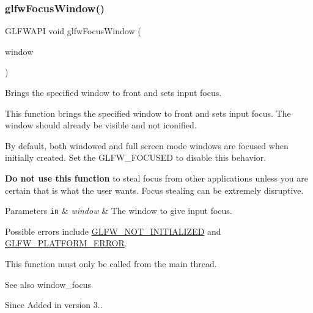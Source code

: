 \subsubsection{\texorpdfstring{glfw\+Focus\+Window()}{glfwFocusWindow()}}
{\footnotesize\ttfamily G\+L\+F\+W\+A\+PI void glfw\+Focus\+Window (\begin{DoxyParamCaption}\item[{\hyperlink{group__window_ga3c96d80d363e67d13a41b5d1821f3242}{G\+L\+F\+Wwindow} $\ast$}]{window }\end{DoxyParamCaption})}



Brings the specified window to front and sets input focus. 

This function brings the specified window to front and sets input focus. The window should already be visible and not iconified.

By default, both windowed and full screen mode windows are focused when initially created. Set the G\+L\+F\+W\+\_\+\+F\+O\+C\+U\+S\+ED to disable this behavior.

{\bfseries Do not use this function} to steal focus from other applications unless you are certain that is what the user wants. Focus stealing can be extremely disruptive.


\begin{DoxyParams}[1]{Parameters}
\mbox{\tt in}  & {\em window} & The window to give input focus.\\
\hline
\end{DoxyParams}
Possible errors include \hyperlink{group__errors_ga2374ee02c177f12e1fa76ff3ed15e14a}{G\+L\+F\+W\+\_\+\+N\+O\+T\+\_\+\+I\+N\+I\+T\+I\+A\+L\+I\+Z\+ED} and \hyperlink{group__errors_gad44162d78100ea5e87cdd38426b8c7a1}{G\+L\+F\+W\+\_\+\+P\+L\+A\+T\+F\+O\+R\+M\+\_\+\+E\+R\+R\+OR}.

This function must only be called from the main thread.

\begin{DoxySeeAlso}{See also}
window\+\_\+focus
\end{DoxySeeAlso}
\begin{DoxySince}{Since}
Added in version 3.. 
\end{DoxySince}
\mbox{\label{group__window_gaf7d17f3534b4b6dc9a6f905e3a240b7e}} 
